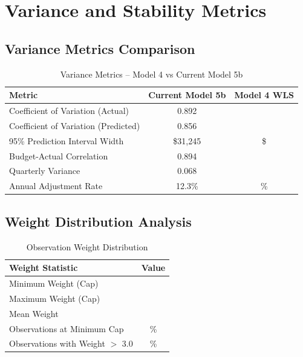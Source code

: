 \section{Variance and Stability Metrics}

\subsection{Variance Metrics Comparison}

\begin{table}[h]
\centering
\caption{Variance Metrics -- Model 4 vs Current Model 5b}
\begin{tabular}{lcc}
\toprule
\textbf{Metric} & \textbf{Current Model 5b} & \textbf{Model 4 WLS} \\
\midrule
Coefficient of Variation (Actual) & 0.892 & \ModelFourCVActual{} \\
Coefficient of Variation (Predicted) & 0.856 & \ModelFourCVPredicted{} \\
95\% Prediction Interval Width & \$31,245 & \$\ModelFourPredictionInterval{} \\
Budget-Actual Correlation & 0.894 & \ModelFourBudgetActualCorr{} \\
Quarterly Variance & 0.068 & \ModelFourQuarterlyVariance{} \\
Annual Adjustment Rate & 12.3\% & \ModelFourAnnualAdjustmentRate{}\% \\
\bottomrule
\end{tabular}
\end{table}

\subsection{Weight Distribution Analysis}

\begin{table}[h]
\centering
\caption{Observation Weight Distribution}
\begin{tabular}{lc}
\toprule
\textbf{Weight Statistic} & \textbf{Value} \\
\midrule
Minimum Weight (Cap) & \ModelFourWeightMin{} \\
Maximum Weight (Cap) & \ModelFourWeightMax{} \\
Mean Weight & \ModelFourWeightMean{} \\
Observations at Minimum Cap & \ModelFourWeightAtMinPct{}\% \\
Observations with Weight $>$ 3.0 & \ModelFourWeightAboveThreePct{}\% \\
\bottomrule
\end{tabular}
\end{table}

